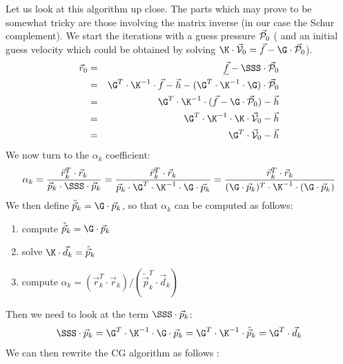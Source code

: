 Let us look at this algorithm up close. The parts which may prove to be somewhat tricky 
are those involving the matrix inverse (in our case the Schur complement).
We start the iterations with a guess pressure $\vec{\cal P}_0$ (
and an initial guess velocity which could be obtained by solving $\K\cdot \vec{\cal V}_0 =\vec{f}- \G\cdot \vec{\cal P}_0$).
\begin{eqnarray}
\vec{r}_0 
&=& \underline{\vec{f}}-\SSS \cdot \vec{\cal P}_0 \\
&=& \G^T\cdot \K^{-1}\cdot \vec{f} - \vec{h} - (\G^T\cdot \K^{-1}\cdot \G )\cdot \vec{\cal P}_0 \\ 
&=& \G^T\cdot \K^{-1}\cdot (\vec{f} - \G\cdot \vec{\cal P}_0) - \vec{h} \\
&=& \G^T\cdot \K^{-1}\cdot \K\cdot \vec{\cal V}_0 - \vec{h} \\ 
&=& \G^T\cdot \vec{\cal V}_0 - \vec{h} \\ 
\end{eqnarray}
We now turn to the $\alpha_k$ coefficient:
\[
\alpha_k 
= \frac{\vec{r}_k^T\cdot \vec{r}_k }{\vec{p}_k \cdot \SSS\cdot  \vec{p}_k } 
= \frac{\vec{r}_k^T \cdot \vec{r}_k }{\vec{p}_k\cdot \G^T \cdot \K^{-1} \cdot \G \cdot \vec{p}_k } 
= \frac{\vec{r}_k^T \cdot \vec{r}_k }{(\G\cdot \vec{p}_k)^T \cdot  \K^{-1} \cdot (\G \cdot \vec{p}_k) } 
\]
We then define $\tilde{\vec{p}}_k = \G \cdot \vec{p}_k$, so that $\alpha_k$ can be computed as follows:
\begin{enumerate}
\item compute $\tilde{\vec{p}}_k = \G \cdot  \vec{p}_k$
\item solve $\K\cdot  \vec{d}_k = \tilde{\vec{p}}_k$
\item compute $\alpha_k=(\vec{r}_k^T \cdot \vec{r}_k)/(\tilde{\vec{p}}_k^T \cdot \vec{d}_k)$
\end{enumerate}
Then we need to look at the term $\SSS\cdot \vec{p}_k$:
\[
\SSS\cdot \vec{p}_k = \G^T\cdot \K^{-1}\cdot \G\cdot \vec{p}_k = \G^T\cdot \K^{-1}\cdot \tilde{\vec{p}}_k = \G^T\cdot  \vec{d}_k
\]
We can then rewrite the CG algorithm as follows \cite{zhym12}:
